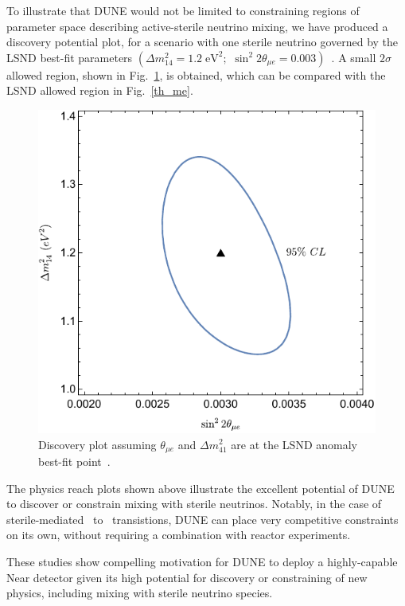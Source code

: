 To illustrate that DUNE would not be limited to constraining regions of parameter space describing active-sterile neutrino mixing, we have produced a discovery potential plot, for a scenario with one sterile neutrino governed by the LSND best-fit parameters $\left(\Delta m_{14}^2= 1.2\;\text{eV}^2;\,\,\sin^2{2\theta_{\mu e}}=0.003\right)$~\cite{LSNDSterile}. A small $2\sigma$ allowed region, shown in Fig.~\ref{Dis_plot_me}, is obtained, which can be compared with the LSND allowed region in Fig.~\ref{th_me}. 
\begin{figure}[!h]
\centering
\includegraphics[scale=0.8]{graphics/dpme}
\caption{Discovery plot assuming $\theta_{\mu e}$ and $\Delta m_{41}^2$ are at the LSND anomaly best-fit point~\cite{LSNDSterile}.}
\label{Dis_plot_me}
\end{figure}

The physics reach plots shown above illustrate the excellent potential of DUNE to discover or constrain mixing with sterile neutrinos. Notably, in the case of sterile-mediated \numu~to \nue~transistions, DUNE can place very competitive constraints on its own, without requiring a combination with reactor experiments. 

These studies show compelling motivation for DUNE to deploy a highly-capable Near detector given its high potential for discovery or constraining of new physics, including mixing with sterile neutrino species.



